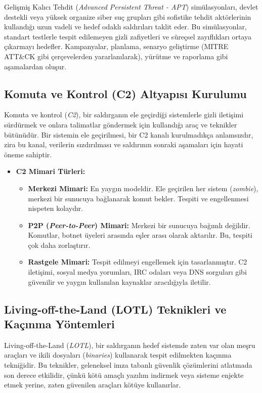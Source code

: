 Gelişmiş Kalıcı Tehdit (\textit{Advanced Persistent Threat - APT}) simülasyonları, devlet destekli veya yüksek organize siber suç grupları gibi sofistike tehdit aktörlerinin kullandığı uzun vadeli ve hedef odaklı saldırıları taklit eder. Bu simülasyonlar, standart testlerle tespit edilemeyen gizli zafiyetleri ve süreçsel zayıflıkları ortaya çıkarmayı hedefler. Kampanyalar, planlama, senaryo geliştirme (MITRE ATT\&CK gibi çerçevelerden yararlanılarak), yürütme ve raporlama gibi aşamalardan oluşur.

\subsection{Komuta ve Kontrol (C2) Altyapısı Kurulumu}

Komuta ve kontrol (\textit{C2}), bir saldırganın ele geçirdiği sistemlerle gizli iletişimi sürdürmek ve onlara talimatlar göndermek için kullandığı araç ve teknikler bütünüdür. Bir sistemin ele geçirilmesi, bir C2 kanalı kurulmadıkça anlamsızdır, zira bu kanal, verilerin sızdırılması ve saldırının sonraki aşamaları için hayati öneme sahiptir.

\begin{itemize}
\item \textbf{C2 Mimari Türleri:}
\begin{itemize}
\item \textbf{Merkezi Mimari:} En yaygın modeldir. Ele geçirilen her sistem (\textit{zombie}), merkezi bir sunucuya bağlanarak komut bekler. Tespiti ve engellenmesi nispeten kolaydır.
\item \textbf{P2P (\textit{Peer-to-Peer}) Mimari:} Merkezi bir sunucuya bağımlı değildir. Komutlar, botnet üyeleri arasında eşler arası olarak aktarılır. Bu, tespiti çok daha zorlaştırır.
\item \textbf{Rastgele Mimari:} Tespit edilmeyi engellemek için tasarlanmıştır. C2 iletişimi, sosyal medya yorumları, IRC odaları veya DNS sorguları gibi güvenilir ve yaygın kullanılan kaynaklar aracılığıyla iletilir.
\end{itemize}
\end{itemize}

\subsection{Living-off-the-Land (LOTL) Teknikleri ve Kaçınma Yöntemleri}

Living-off-the-Land (\textit{LOTL}), bir saldırganın hedef sistemde zaten var olan meşru araçları ve ikili dosyaları (\textit{binaries}) kullanarak tespit edilmekten kaçınma tekniğidir. Bu teknikler, geleneksel imza tabanlı güvenlik çözümlerini atlatmada son derece etkilidir, çünkü kötü amaçlı yazılım indirmek veya sisteme enjekte etmek yerine, zaten güvenilen araçları kötüye kullanırlar.

